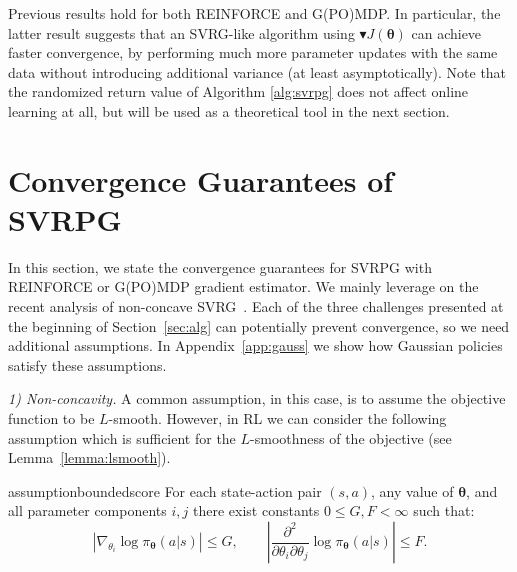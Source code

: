 \documentclass{article}
\theoremstyle{remark}
\theoremstyle{definition}
\DeclareMathOperator*{\Var}{\mathbb{V}ar}
\newcommand{\vtheta}{\boldsymbol{\theta}}
\newcommand{\gradApp}[2]{\widehat{\nabla}_{#2}J(#1)}
\newcommand{\gradBlack}[1]{\blacktriangledown J(#1)}
\newcommand{\GRADLOG}{G}
\newcommand{\HESSLOG}{F}
\begin{document}
Previous results hold for both REINFORCE and G(PO)MDP.
In particular, the latter result suggests that an SVRG-like algorithm using $\gradBlack{\vtheta}$ can achieve faster convergence, by performing much more parameter updates with the same data without introducing additional variance (at least asymptotically).
Note that the randomized return value of Algorithm \ref{alg:svrpg} does not affect online learning at all, but will be used as a theoretical tool in the next section.

\vspace{-0.05in}
\section{Convergence Guarantees of SVRPG}\label{sec:conv}
\vspace{-0.05in}
In this section, we state the convergence guarantees for SVRPG with REINFORCE or G(PO)MDP gradient estimator.
We mainly leverage on the recent analysis of non-concave SVRG~\cite{reddi2016stochastic,allen2016variance}.
Each of the three challenges presented at the beginning of Section~\ref{sec:alg} can potentially prevent convergence, so we need additional assumptions.
In Appendix~\ref{app:gauss} we show how Gaussian policies satisfy these assumptions.

\textit{1) Non-concavity.} A common assumption, in this case, is to assume the objective function to be $L$-smooth.
However, in RL we can consider the following assumption which is sufficient for the $L$-smoothness of the objective (see Lemma~\ref{lemma:lsmooth}).
	\begin{restatable}{assumption}{boundedscore}\label{ass:bounded_score}
		For each state-action pair $(s,a)$, any value of $\vtheta$, and all parameter components $i,j$ there exist constants $0 \leq G,F<\infty$ such that:
\[
		\left|\nabla_{\theta_i}\log\pi_{\vtheta}(a\vert s)\right| \leq \GRADLOG, \qquad
        \left|\frac{\partial^2}{\partial\theta_i\partial\theta_j}\log\pi_{\vtheta}(a \vert s)\right| \leq \HESSLOG.
\]
	\end{restatable}
\end{document}
